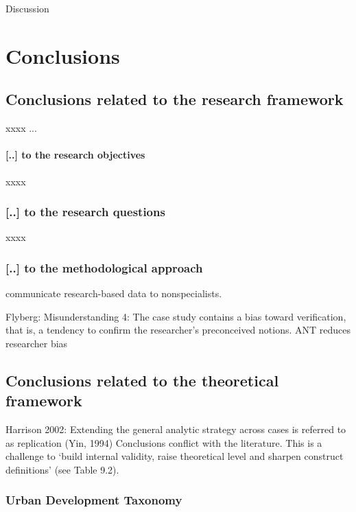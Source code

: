 \documentclass[11pt]{report}
\begin{document}
Discussion


\chapter{Conclusions}


\section{Conclusions related to the research framework}

xxxx ...

\subsubsection{[..] to the research objectives}

xxxx

\subsection{[..] to the research questions}

xxxx

\subsection{[..] to the methodological approach}

communicate research-based data to nonspecialists.

Flyberg: 
Misunderstanding 4: The case study contains a bias toward verification, that is, a tendency to confirm the researcher's preconceived notions.
ANT reduces researcher bias

\section{Conclusions related to the theoretical framework}

Harrison 2002:
Extending the general analytic strategy across cases is referred to as replication (Yin, 1994)
Conclusions conflict with the literature. This is a challenge to
‘build internal validity, raise theoretical level and sharpen construct definitions’ (see Table 9.2).

\subsection{Urban Development Taxonomy}
\end{document}
